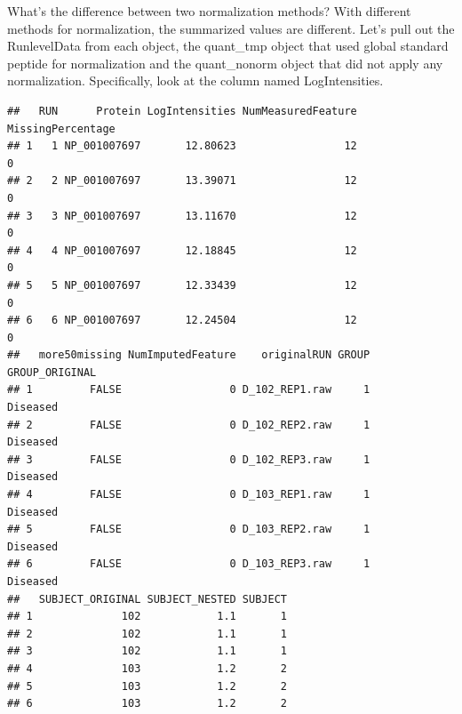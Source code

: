 \documentclass[]{book}
\newenvironment{Shaded}{\begin{snugshade}}{\end{snugshade}}
\newcommand{\KeywordTok}[1]{\textcolor[rgb]{0.13,0.29,0.53}{\textbf{#1}}}
\newcommand{\NormalTok}[1]{#1}
\newcommand{\OperatorTok}[1]{\textcolor[rgb]{0.81,0.36,0.00}{\textbf{#1}}}
\begin{document}
What's the difference between two normalization methods?
With different methods for normalization, the summarized values are different. Let's pull out the RunlevelData from each object, the quant\_tmp object that used global standard peptide for normalization and the quant\_nonorm object that did not apply any normalization. Specifically, look at the column named LogIntensities.

\begin{Shaded}
\end{Shaded}

\begin{verbatim}
##   RUN      Protein LogIntensities NumMeasuredFeature MissingPercentage
## 1   1 NP_001007697       12.80623                 12                 0
## 2   2 NP_001007697       13.39071                 12                 0
## 3   3 NP_001007697       13.11670                 12                 0
## 4   4 NP_001007697       12.18845                 12                 0
## 5   5 NP_001007697       12.33439                 12                 0
## 6   6 NP_001007697       12.24504                 12                 0
##   more50missing NumImputedFeature    originalRUN GROUP GROUP_ORIGINAL
## 1         FALSE                 0 D_102_REP1.raw     1       Diseased
## 2         FALSE                 0 D_102_REP2.raw     1       Diseased
## 3         FALSE                 0 D_102_REP3.raw     1       Diseased
## 4         FALSE                 0 D_103_REP1.raw     1       Diseased
## 5         FALSE                 0 D_103_REP2.raw     1       Diseased
## 6         FALSE                 0 D_103_REP3.raw     1       Diseased
##   SUBJECT_ORIGINAL SUBJECT_NESTED SUBJECT
## 1              102            1.1       1
## 2              102            1.1       1
## 3              102            1.1       1
## 4              103            1.2       2
## 5              103            1.2       2
## 6              103            1.2       2
\end{verbatim}

\begin{Shaded}
\end{Shaded}
\end{document}
